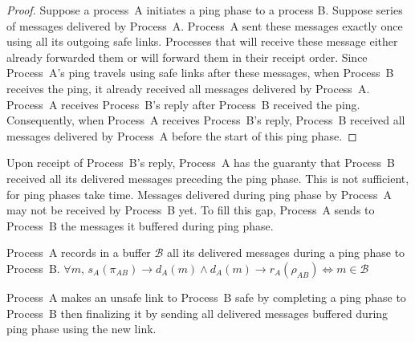 \begin{proof}
  Suppose a process~A initiates a ping phase to a process B. Suppose series of
  messages delivered by Process~A. Process~A sent these messages exactly once
  using all its outgoing safe links. Processes that will receive these message
  either already forwarded them or will forward them in their receipt
  order. Since Process~A's ping travels using safe links after these messages,
  when Process~B receives the ping, it already received all messages delivered
  by Process~A. Process~A receives Process~B's reply after Process~B received
  the ping. Consequently, when Process~A receives Process~B's reply, Process~B
  received all messages delivered by Process~A before the start of this ping
  phase.
\end{proof}

Upon receipt of Process~B's reply, Process~A has the guaranty that Process~B
received all its delivered messages preceding the ping phase. This is not
sufficient, for ping phases take time. Messages delivered during ping phase by
Process~A may not be received by Process~B yet. To fill this gap, Process~A
sends to Process~B the messages it buffered during ping phase.

\begin{definition}[Buffering]
  Process~A records in a buffer $\mathcal{B}$ all its delivered messages during
  a ping phase to Process~B.
  $\forall m,\, s_A(\pi_{AB}) \rightarrow d_A(m) \wedge d_A(m)\rightarrow
  r_A(\rho_{AB}) \Leftrightarrow m \in \mathcal{B} $
\end{definition}


\begin{lemma}
  Process~A makes an unsafe link to Process~B safe by completing a ping phase to
  Process~B then finalizing it by sending all delivered messages buffered during
  ping phase using the new link.
\end{lemma}


